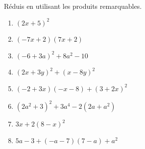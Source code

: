 %
%
    Réduis en utilisant les produits remarquables.
    \begin{enumerate}[cols=2]
        \item \((2x+5)^2\)
        \item \((-7x + 2)(7x + 2)\)
        \item \((-6 + 3a)^2 + 8a^2 - 10\)
        \item \((2x + 3y)^2 + (x-8y)^2\)
        \item \((-2+3x)(-x-8) + (3+2x)^2\)
        \item \((2a^2 + 3)^2 + 3a^4 - 2(2a + a^2) \)
        \item \(3x + 2(8-x)^2\)
        \item \(5a - 3 + (-a - 7)(7 - a) + a^2\)
    \end{enumerate}
